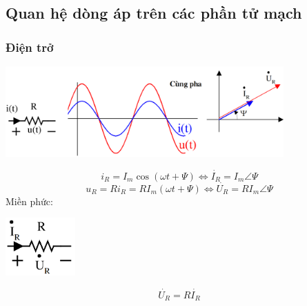\subsection{Quan hệ dòng áp trên các phần tử mạch}
\subsubsection{Điện trở}
\begin{center}
    \includegraphics[width = 0.8\textwidth]{./image/37.png}
\end{center}
\begin{equation}
    i_R = I_m \cos (\omega t + \varPsi) \Leftrightarrow \dot{I_R} = I_m \angle \varPsi
\end{equation}
\begin{equation}
    u_R = Ri_R = RI_m (\omega t + \varPsi) \Leftrightarrow \dot{U_R} = RI_m \angle \varPsi
\end{equation}
Miền phức:
\begin{center}
    \includegraphics[width = 0.2\textwidth]{./image/38.png}
\end{center}
\begin{equation}
    \dot{U_R} = R\dot{I_R}
\end{equation}
